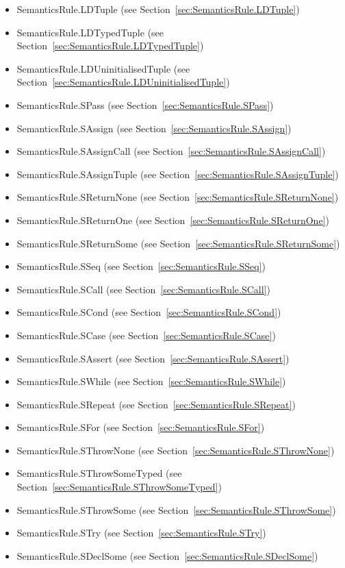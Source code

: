 \documentclass{book}
\begin{document}
\begin{itemize}
\item SemanticsRule.LDTuple (see Section~\ref{sec:SemanticsRule.LDTuple})
\item SemanticsRule.LDTypedTuple (see Section~\ref{sec:SemanticsRule.LDTypedTuple})
\item SemanticsRule.LDUninitialisedTuple (see Section~\ref{sec:SemanticsRule.LDUninitialisedTuple})
\item SemanticsRule.SPass (see Section~\ref{sec:SemanticsRule.SPass})
\item SemanticsRule.SAssign (see Section~\ref{sec:SemanticsRule.SAssign})
\item SemanticsRule.SAssignCall (see Section~\ref{sec:SemanticsRule.SAssignCall})
\item SemanticsRule.SAssignTuple (see Section~\ref{sec:SemanticsRule.SAssignTuple})
\item SemanticsRule.SReturnNone (see Section~\ref{sec:SemanticsRule.SReturnNone})
\item SemanticsRule.SReturnOne (see Section~\ref{sec:SemanticsRule.SReturnOne})
\item SemanticsRule.SReturnSome (see Section~\ref{sec:SemanticsRule.SReturnSome})
\item SemanticsRule.SSeq (see Section~\ref{sec:SemanticsRule.SSeq})
\item SemanticsRule.SCall (see Section~\ref{sec:SemanticsRule.SCall})
\item SemanticsRule.SCond (see Section~\ref{sec:SemanticsRule.SCond})
\item SemanticsRule.SCase (see Section~\ref{sec:SemanticsRule.SCase})
\item SemanticsRule.SAssert (see Section~\ref{sec:SemanticsRule.SAssert})
\item SemanticsRule.SWhile (see Section~\ref{sec:SemanticsRule.SWhile})
\item SemanticsRule.SRepeat (see Section~\ref{sec:SemanticsRule.SRepeat})
\item SemanticsRule.SFor (see Section~\ref{sec:SemanticsRule.SFor})
\item SemanticsRule.SThrowNone (see Section~\ref{sec:SemanticsRule.SThrowNone})
\item SemanticsRule.SThrowSomeTyped (see Section~\ref{sec:SemanticsRule.SThrowSomeTyped})
\item SemanticsRule.SThrowSome (see Section~\ref{sec:SemanticsRule.SThrowSome})
\item SemanticsRule.STry (see Section~\ref{sec:SemanticsRule.STry})
\item SemanticsRule.SDeclSome (see Section~\ref{sec:SemanticsRule.SDeclSome})

\end{itemize}
\end{document}
